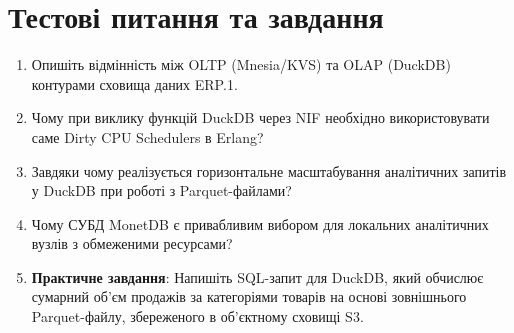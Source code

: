 \section{Тестові питання та завдання}
\begin{enumerate}
    \item Опишіть відмінність між OLTP (Mnesia/KVS) та OLAP (DuckDB) контурами сховища даних ERP.1.
    \item Чому при виклику функцій DuckDB через NIF необхідно використовувати саме Dirty CPU Schedulers в Erlang?
    \item Завдяки чому реалізується горизонтальне масштабування аналітичних запитів у DuckDB при роботі з Parquet-файлами?
    \item Чому СУБД MonetDB є привабливим вибором для локальних аналітичних вузлів з обмеженими ресурсами?
    \item \textbf{Практичне завдання}: Напишіть SQL-запит для DuckDB, який обчислює сумарний об'єм продажів за категоріями товарів на основі зовнішнього Parquet-файлу, збереженого в об'єктному сховищі S3.
\end{enumerate}
